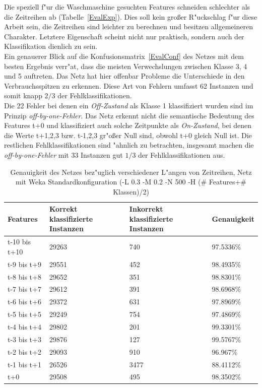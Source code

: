 Die speziell f"ur die Waschmaschine gesuchten Features schneiden schlechter als die Zeitreihen ab (Tabelle~\ref{EvalExp}). Dies soll kein gro{\ss}er R"uckschlag f"ur diese Arbeit sein, die Zeitreihen sind leichter zu berechnen und besitzen allgemeineren Charakter. Letztere Eigenschaft scheint nicht nur praktisch, sondern auch der Klassifikation dienlich zu sein.\\

Ein genauerer Blick auf die Konfusionsmatrix~\ref{EvalConf} des Netzes mit dem besten Ergebnis verr"at, dass die meisten Verwechslungen zwischen Klasse 3, 4 und 5 auftreten. Das Netz hat hier offenbar Probleme die Unterschiede in den Verbrauchsspitzen zu erkennen. Diese Art von Fehlern umfasst 62 Instanzen und somit knapp $2/3$ der Fehlklassifikationen. \\
Die 22 Fehler bei denen ein \textit{Off-Zustand} als Klasse 1 klassifiziert wurden sind im Prinzip \textit{off-by-one-Fehler}. Das Netz erkennt nicht die semantische Bedeutung des Features t+0 und klassifiziert auch solche Zeitpunkte als \textit{On-Zustand}, bei denen die Werte t+1,2,3 bzw. t-1,2,3 gr"o{\ss}er Null sind, obwohl t+0 gleich Null ist. Die restlichen Fehlklassifikationen sind "ahnlich zu betrachten, insgesamt machen die \textit{off-by-one-Fehler} mit 33 Instanzen gut $1/3$ der Fehlklassifikationen aus. \\

\begin{table}[h]
\begin{tabular}{l|p{4cm}|p{4cm}|l}
Features & Korrekt klassifizierte Instanzen & Inkorrekt klassifizierte Instanzen & Genauigkeit  \\
\hline
t-10 bis t+10 & 29263 & 740 & 97.5336\% \\
t-9 bis t+9 & 29551 & 452 & 98.4935\% \\
t-8 bis t+8 & 29652 & 351 & 98.8301\% \\
t-7 bis t+7 & 29612 & 391 & 98.6968\% \\
t-6 bis t+6 & 29372 & 631 & 97.8969\% \\
t-5 bis t+5 & 29249 & 754 & 97.4869\% \\
t-4 bis t+4 & 29802 & 201 & 99.3301\% \\
t-3 bis t+3 & 29876 & 127 & 99.5767\% \\
t-2 bis t+2 & 29093 & 910 & 96.967\% \\
t-1 bis t+1 & 26526 & 3477 & 88.4112\% \\
t+0 & 29508 & 495 & 98.3502\% 
\end{tabular}
\caption[Genauigkeit der Zeitreihen Features]{Genauigkeit des Netzes bez"uglich verschiedener L"angen von Zeitreihen, Netz mit Weka Standardkonfiguration (-L 0.3 -M 0.2 -N 500 -H (\# Features+\# Klassen)/2)}
\label{EvalZeit}
\end{table}


